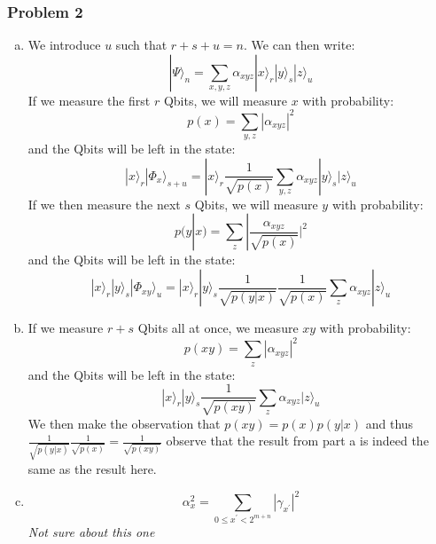 \documentclass[a4paper,11pt]{article}
\begin{document}
\subsubsection*{Problem 2}
\begin{enumerate}[a)]
    \item We introduce $u$ such that $r+s+u=n$. We can then write:
        $$|\Psi\rangle_n=\sum\limits_{x,y,z}\alpha_{xyz}|x\rangle_r|y\rangle_s|z\rangle_u$$
        If we measure the first $r$ Qbits, we will measure $x$ with probability:
        $$p(x)=\sum\limits_{y,z}|\alpha_{xyz}|^2$$
        and the Qbits will be left in the state:
        $$|x\rangle_r|\Phi_x\rangle_{s+u}=|x\rangle_r\frac{1}{\sqrt{p(x)}}\sum\limits_{y,z}\alpha_{xyz}|y\rangle_s|z\rangle_u$$
        If we then measure the next $s$ Qbits, we will measure $y$ with probability:
        $$p(y|x)=\sum\limits_{z}|\frac{\alpha_{xyz}}{\sqrt{p(x)}}|^2$$
        and the Qbits will be left in the state:
        $$|x\rangle_r|y\rangle_s|\Phi_{xy}\rangle_{u}=|x\rangle_r|y\rangle_s\frac{1}{\sqrt{p(y|x)}}\frac{1}{\sqrt{p(x)}}\sum\limits_{z}\alpha_{xyz}|z\rangle_u$$
    \item If we measure $r+s$ Qbits all at once, we measure $xy$ with probability:
        $$p(xy)=\sum\limits_{z}|\alpha_{xyz}|^2$$
        and the Qbits will be left in the state:
        $$|x\rangle_r|y\rangle_s\frac{1}{\sqrt{p(xy)}}\sum\limits_{z}\alpha_{xyz}|z\rangle_u$$
        We then make the observation that $p(xy)=p(x)p(y|x)$ and thus $\frac{1}{\sqrt{p(y|x)}}\frac{1}{\sqrt{p(x)}}=\frac{1}{\sqrt{p(xy)}}$ observe that the result from part a is indeed the same as the result here.
    \item $$\alpha_x^2=\sum\limits_{0\leq x^\prime<2^{m+n}}|\gamma_{x^\prime}|^2$$
\emph{\color{red} Not sure about this one}
\end{enumerate}
\end{document}
